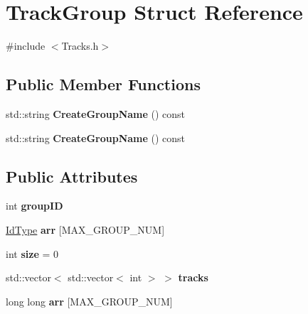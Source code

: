 \hypertarget{class_track_group}{}\section{Track\+Group Struct Reference}
\label{class_track_group}


{\ttfamily \#include $<$Tracks.\+h$>$}

\subsection*{Public Member Functions}
\begin{DoxyCompactItemize}
\item 
\mbox{\label{class_track_group_a293ba3cf81474c79045986fd312ef02c}} 
std\+::string {\bfseries Create\+Group\+Name} () const
\item 
\mbox{\label{class_track_group_a293ba3cf81474c79045986fd312ef02c}} 
std\+::string {\bfseries Create\+Group\+Name} () const
\end{DoxyCompactItemize}
\subsection*{Public Attributes}
\begin{DoxyCompactItemize}
\item 
\mbox{\label{class_track_group_a2a58c0b4da7f12c44a21ad23801b40b3}} 
int {\bfseries group\+ID}
\item 
\mbox{\label{class_track_group_a666a8f118167e57dd4456be90858956a}} 
\mbox{\hyperlink{class_big_integer}{Id\+Type}} {\bfseries arr} \mbox{[}M\+A\+X\+\_\+\+G\+R\+O\+U\+P\+\_\+\+N\+UM\mbox{]}
\item 
\mbox{\label{class_track_group_a339ec7ee74e2c37e860bc4a93e2429b5}} 
int {\bfseries size} = 0
\item 
\mbox{\label{class_track_group_a77700a04c56cef5fac6f484ecd985061}} 
std\+::vector$<$ std\+::vector$<$ int $>$ $>$ {\bfseries tracks}
\item 
\mbox{\label{class_track_group_a94997a9a7332e3fd5e1b4cc86fddbda3}} 
long long {\bfseries arr} \mbox{[}M\+A\+X\+\_\+\+G\+R\+O\+U\+P\+\_\+\+N\+UM\mbox{]}
\end{DoxyCompactItemize}


